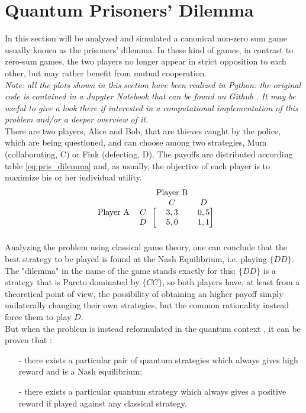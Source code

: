 \hfill

\section{Quantum Prisoners' Dilemma}
In this section will be analyzed and simulated a canonical non-zero sum game usually known as the prisoners' dilemma. In these kind of games, in contrast to zero-sum games, the two players no longer appear in strict opposition to each other, but may rather benefit from mutual cooperation. \\
\textit{
Note: all the plots shown in this section have been realized in Python: the original code is contained in a Jupyter Notebook that can be found on Github \cite{Pujatti_github}. It may be useful to give a look there if interested in a computational implementation of this problem and/or a deeper overview of it.}\\
There are two players, Alice and Bob, that are thieves caught by the police, which are being questioned, and can choose among two strategies, Mum (collaborating, C) or Fink (defecting, D). The payoffs are distributed according table \ref{eq:pris_dilemma} and, as usually, the objective of each player is to maximize his or her individual utility.
\begin{equation}
\begin{blockarray}{cccc}
& & \text{Player B}&\\
& & C & D\\
\begin{block}{cc[cc]}
\text{Player A} & C & 3,3 &  0,5 \\
 & D & 5,0 & 1,1 \\
\end{block}
\end{blockarray}
\label{eq:pris_dilemma}
\end{equation}
Analyzing the problem using classical game theory, one can conclude that the best strategy to be played is found at the Nash Equilibrium, i.e. playing $\{DD\}$. The "dilemma" in the name of the game stands exactly for this: $\{DD\}$ is a strategy that is Pareto dominated by $\{CC\}$, so both players have, at least from a theoretical point of view, the possibility of obtaining an higher payoff simply unilaterally changing their own strategies, but the common rationality instead force them to play $D$.\\
But when the problem is instead reformulated in the quantum context \cite{Eisert_2020}, it can be proven that :
\begin{itemize}[noitemsep]
	\item[-] there exists
a particular pair of quantum strategies which always gives high reward and is a Nash equilibrium;
	\item[-] there exists a particular quantum strategy which always gives a positive reward if played
against any classical strategy.
\end{itemize}
